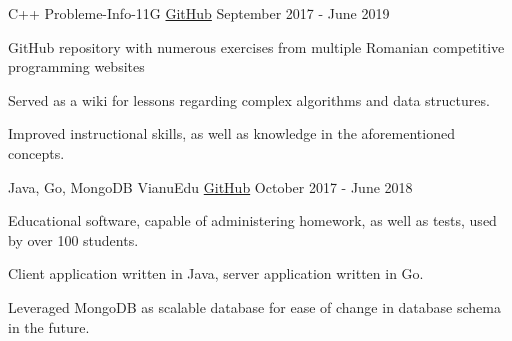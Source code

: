 
\begin{cventries}
  \cventry
    {C++}
    {Probleme-Info-11G}
    {\href{https://github.com/StormFireFox1/Probleme-Info-11G}{GitHub}}
    {September 2017 - June 2019}
    {
      \begin{cvitems}
        \item {GitHub repository with numerous exercises from multiple Romanian competitive programming websites}
        \item {Served as a wiki for lessons regarding complex algorithms and data structures.}
        \item {Improved instructional skills, as well as knowledge in the aforementioned concepts.}
      \end{cvitems}
    }
    \cventry
      {Java, Go, MongoDB}
      {VianuEdu}
      {\href{https://github.com/CNITV/VianuEdu}{GitHub}}
      {October 2017 - June 2018}
      {
        \begin{cvitems}
          \item {Educational software, capable of administering homework, as well as tests, used by over 100 students.}
          \item {Client application written in Java, server application written in Go.}
          \item {Leveraged MongoDB as scalable database for ease of change in database schema in the future.}
        \end{cvitems}
      }
\end{cventries}
